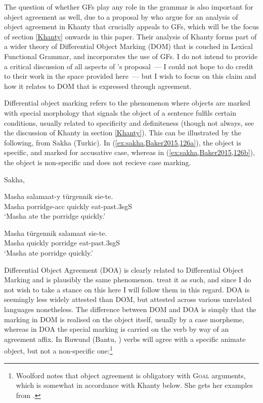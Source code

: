 \documentclass[output=paper
,modfonts
,nonflat]{langsci/langscibook}
\begin{document}
The question of whether GFs play any role in the grammar is also important for object agreement as well, due to a proposal by \citet{dn2011} who argue for an analysis of object agreement in Khanty that crucially appeals to GFs, which will be the focus of section \ref{Khanty} onwards in this paper.
Their analysis of Khanty forms part of a wider theory of Differential Object Marking (DOM) that is couched in Lexical Functional Grammar, and incorporates the use of GFs. I do not intend to provide a critical discussion of all aspects of \citeauthor{dn2011}'s proposal~--- I could not hope to do credit to their work in the space provided here~--- but I wish to focus on this claim and how it relates to DOM that is expressed through agreement.



Differential object marking refers to the phenomenon where objects are marked with special morphology that signals the object of a sentence fulfils certain conditions, usually related to specificity and definiteness (though not always, see the discussion of Khanty in section \ref{Khanty}).
This can be illustrated by the following, from Sakha (Turkic).
In (\ref{ex:sakha,Baker2015,126a}), the object is specific, and marked for accusative case, whereas in (\ref{ex:sakha,Baker2015,126b}), the object is non-specific and does not recieve case marking.

\begin{exe}
  \ex Sakha, \citet[][126]{Baker2015} \label{ex:sakha,Baker2015,126}
\begin{xlist}
\ex
\gll Masha salamaat-y t\"{u}rgennik sie-te.\\
Masha porridge-{\sc acc} quickly eat-{\sc past.3sgS}\\
\glt `Masha ate the porridge quickly.'  \label{ex:sakha,Baker2015,126a}

\ex
\gll Masha t\"{u}rgennik salamaat sie-te.\\
Masha quickly porridge eat-{\sc past.3sgS}\\
\glt `Masha ate porridge quickly.' \label{ex:sakha,Baker2015,126b}
\end{xlist}
\end{exe}


\noindent Differential Object Agreement (DOA) is clearly related to Differential Object Marking and is plausibly the same phenomenon.
\citeauthor{dn2011} treat it as such, and since I do not wish to take a stance on this here I will follow them in this regard. 
DOA is seemingly less widely attested than DOM, but attested across various unrelated languages nonetheless. 
The difference between DOM and DOA is simply that the marking in DOM is realised on the object itself, usually by a case morpheme, whereas in DOA the special marking is carried on the verb by way of an agreement affix. 
In Ruwund (Bantu, \citealt{woolford2001}) verbs will agree with a specific animate object, but not a non-specific one:\footnote{Woolford notes that object agreement is obligatory with \textsc{Goal} arguments, which is somewhat in accordance with Khanty below.
She gets her examples from \citet[][565]{nash1992}.}
\end{document}
